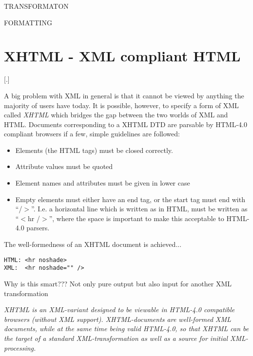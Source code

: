 \textsf{TRANSFORMATON}

\textsf{FORMATTING}



\section{XHTML - XML compliant HTML}

[.]

A big problem with XML in general is that it cannot be viewed by
anything the majority of users have today.  It is possible, however,
to specify a form of XML called \textit{XHTML} which bridges the gap
between the two worlds of XML and HTML.  Documents corresponding to a
XHTML DTD are parsable by HTML-4.0 compliant browsers if a few, simple
guidelines are followed:

\begin{itemize}
\item Elements (the HTML tags) must be closed correctly.
  
\item Attribute values must be quoted
\item Element names and attributes must be given in lower case
  
\item Empty elements must either have an end tag, or the start tag
  must end with ``/$>$''.  I.e. a horizontal line which is written as
   in HTML, must be written as
  ``$<$hr /$>$'', where the space is important to make this acceptable
  to HTML-4.0 parsers.
\end{itemize}

The well-formedness of an XHTML document is achieved\textsf{...}

\begin{verbatim}
HTML: <hr noshade>
XML:  <hr noshade="" />
\end{verbatim}


\textsf{Why is this smart???  Not only pure output but also input for
  another XML transformation}  

\textit{
\textsf{XHTML} is an XML-variant designed to be viewable in HTML-4.0
compatible browsers (without XML support).  XHTML-documents are
well-formed XML documents, while at the same time being valid
HTML-4.0, so that XHTML can be the target of a standard
XML-\textit{transformation} as well as a source for initial
XML-processing.}

